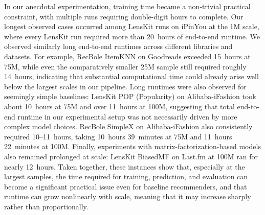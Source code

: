 \documentclass[12pt,a4paper]{article}
\begin{document}
In our anecdotal experimentation, training time became a non-trivial practical constraint, with multiple runs requiring double-digit hours to complete. Our longest observed cases occurred among LensKit runs on iPinYou at the 1M scale, where every LensKit run required more than 20~hours of end-to-end runtime. We observed similarly long end-to-end runtimes across different libraries and datasets. For example, RecBole ItemKNN on Goodreads exceeded 15~hours at 75M, while even the comparatively smaller 25M sample still required roughly 14~hours, indicating that substantial computational time could already arise well below the largest scales in our pipeline. Long runtimes were also observed for seemingly simple baselines: LensKit POP (Popularity) on Alibaba-iFashion took about 10~hours at 75M and over 11~hours at 100M, suggesting that total end-to-end runtime in our experimental setup was not necessarily driven by more complex model choices. RecBole SimpleX on Alibaba-iFashion also consistently required 10--11~hours, taking 10~hours 39~minutes at 75M and 11~hours 22~minutes at 100M. Finally, experiments with matrix-factorization-based models also remained prolonged at scale: LensKit BiasedMF on Last.fm at 100M ran for nearly 12~hours. Taken together, these instances show that, especially at the largest samples, the time required for training, prediction, and evaluation can become a significant practical issue even for baseline recommenders, and that runtime can grow nonlinearly with scale, meaning that it may increase sharply rather than proportionally.
\end{document}
